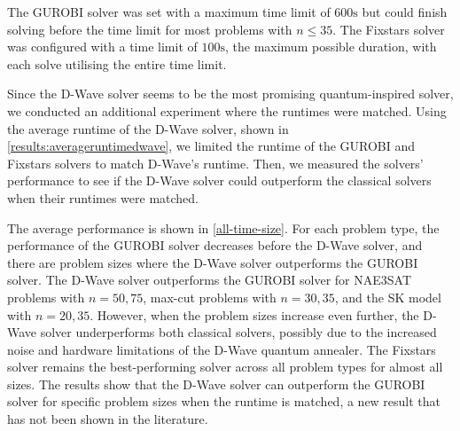 The GUROBI solver was set with a maximum time limit of $600 \si{\second}$ but could finish solving before the time limit for most problems with $n \leq 35$. The Fixstars solver was configured with a time limit of $100 \si{\second}$, the maximum possible duration, with each solve utilising the entire time limit.

Since the D-Wave solver seems to be the most promising quantum-inspired solver, we conducted an additional experiment where the runtimes were matched. Using the average runtime of the D-Wave solver, shown in \autoref{results:averageruntimedwave}, we limited the runtime of the GUROBI and Fixstars solvers to match D-Wave's runtime. Then, we measured the solvers' performance to see if the D-Wave solver could outperform the classical solvers when their runtimes were matched.

\begin{table}[!htb]
    \centering
    \caption{Average runtime (seconds) of the D-Wave solver by problem type and size. Dashes indicate that the D-Wave solver could not embed problems of that size.}
    \label{results:averageruntimedwave}
\end{table}

The average performance is shown in \autoref{all-time-size}. For each problem type, the performance of the GUROBI solver decreases before the D-Wave solver, and there are problem sizes where the D-Wave solver outperforms the GUROBI solver. The D-Wave solver outperforms the GUROBI solver for NAE3SAT problems with $n=50, 75$, max-cut problems with $n=30, 35$, and the SK model with $n=20, 35$. However, when the problem sizes increase even further, the D-Wave solver underperforms both classical solvers, possibly due to the increased noise and hardware limitations of the D-Wave quantum annealer. The Fixstars solver remains the best-performing solver across all problem types for almost all sizes. The results show that the D-Wave solver can outperform the GUROBI solver for specific problem sizes when the runtime is matched, a new result that has not been shown in the literature. 

